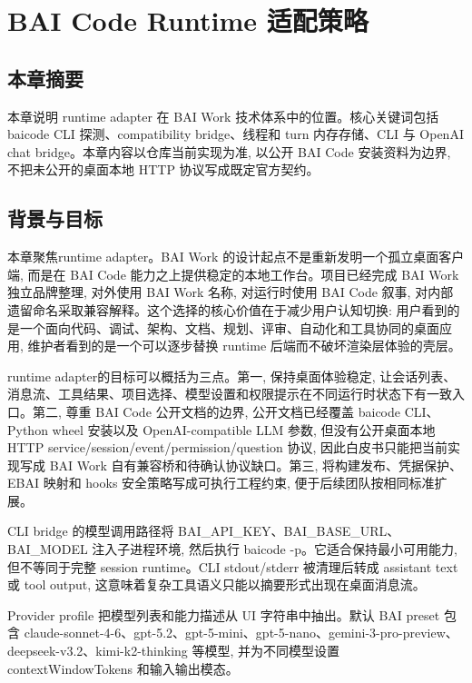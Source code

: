 \chapter{BAI Code Runtime 适配策略}
\section{本章摘要}
本章说明 runtime adapter 在 BAI Work 技术体系中的位置。核心关键词包括 baicode CLI 探测、compatibility bridge、线程和 turn 内存存储、CLI 与 OpenAI chat bridge。本章内容以仓库当前实现为准, 以公开 BAI Code 安装资料为边界, 不把未公开的桌面本地 HTTP 协议写成既定官方契约。

\section{背景与目标}
本章聚焦runtime adapter。BAI Work 的设计起点不是重新发明一个孤立桌面客户端, 而是在 BAI Code 能力之上提供稳定的本地工作台。项目已经完成 BAI Work 独立品牌整理, 对外使用 BAI Work 名称, 对运行时使用 BAI Code 叙事, 对内部遗留命名采取兼容解释。这个选择的核心价值在于减少用户认知切换: 用户看到的是一个面向代码、调试、架构、文档、规划、评审、自动化和工具协同的桌面应用, 维护者看到的是一个可以逐步替换 runtime 后端而不破坏渲染层体验的壳层。

runtime adapter的目标可以概括为三点。第一, 保持桌面体验稳定, 让会话列表、消息流、工具结果、项目选择、模型设置和权限提示在不同运行时状态下有一致入口。第二, 尊重 BAI Code 公开文档的边界, 公开文档已经覆盖 baicode CLI、Python wheel 安装以及 OpenAI-compatible LLM 参数, 但没有公开桌面本地 HTTP service/session/event/permission/question 协议, 因此白皮书只能把当前实现写成 BAI Work 自有兼容桥和待确认协议缺口。第三, 将构建发布、凭据保护、EBAI 映射和 hooks 安全策略写成可执行工程约束, 便于后续团队按相同标准扩展。

CLI bridge 的模型调用路径将 BAI\_API\_KEY、BAI\_BASE\_URL、BAI\_MODEL 注入子进程环境, 然后执行 baicode -p。它适合保持最小可用能力, 但不等同于完整 session runtime。CLI stdout/stderr 被清理后转成 assistant text 或 tool output, 这意味着复杂工具语义只能以摘要形式出现在桌面消息流。

Provider profile 把模型列表和能力描述从 UI 字符串中抽出。默认 BAI preset 包含 claude-sonnet-4-6、gpt-5.2、gpt-5-mini、gpt-5-nano、gemini-3-pro-preview、deepseek-v3.2、kimi-k2-thinking 等模型, 并为不同模型设置 contextWindowTokens 和输入输出模态。


